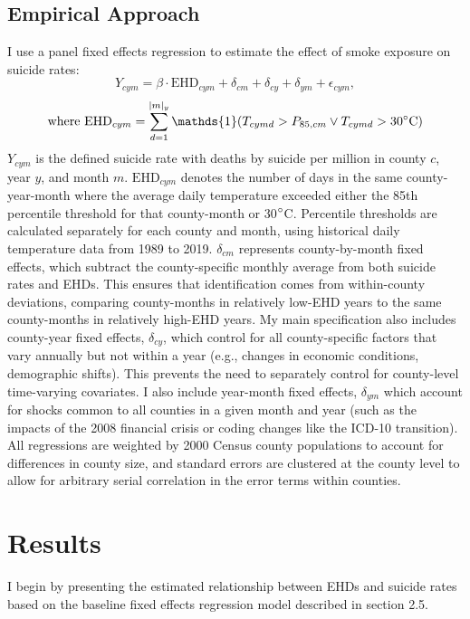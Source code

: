 \documentclass[12pt, a4paper]{article}
\begin{document}
\subsection{Empirical Approach}
I use a panel fixed effects regression to estimate the effect of smoke exposure on suicide rates:
\[
Y_{cym} =  \beta\cdot\text{EHD}_{cym} + \delta_{cm} +\delta_{cy} +\delta_{ym} +\epsilon_{cym},
\]
\[
\text{where EHD}_{cym}=\sum_{d=1}^{|m|_y}\mathds{1}(T_{cymd}>P_{85,cm} \lor T_{cymd}>30\degree\text{C})
\]
$Y_{cym}$ is the defined suicide rate with deaths by suicide per million in county $c$, year $y$, and month $m$. $\text{EHD}_{cym}$ denotes the number of days in the same county-year-month where the average daily temperature exceeded either the 85th percentile threshold for that county-month or 30$\degree$C. Percentile thresholds are calculated separately for each county and month, using historical daily temperature data from 1989 to 2019. $\delta_{cm}$ represents county-by-month fixed effects, which subtract the county-specific monthly average from both suicide rates and EHDs. This ensures that identification comes from within-county deviations, comparing county-months in relatively low-EHD years to the same county-months in relatively high-EHD years. My main specification also includes county-year fixed effects, $\delta_{cy}$, which control for all county-specific factors that vary annually but not within a year (e.g., changes in economic conditions, demographic shifts). This prevents the need to separately control for county-level time-varying covariates. I also include year-month fixed effects, $\delta_{ym}$ which account for shocks common to all counties in a given month and year (such as the impacts of the 2008 financial crisis or coding changes like the ICD-10 transition). All regressions are weighted by 2000 Census county populations to account for differences in county size, and standard errors are clustered at the county level to allow for arbitrary serial correlation in the error terms within counties.


\section{Results}
I begin by presenting the estimated relationship between EHDs and suicide rates based on the baseline fixed effects regression model described in section 2.5.
\end{document}
